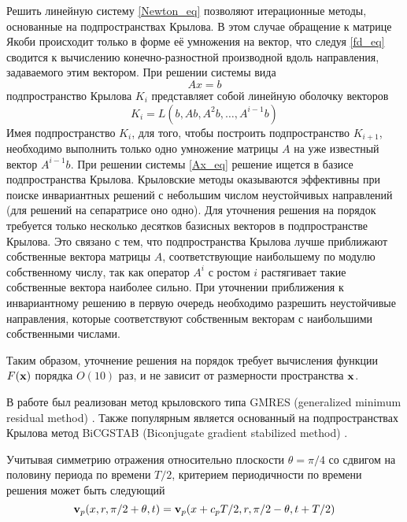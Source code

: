 Решить линейную систему \eqref{Newton_eq} позволяют итерационные методы, основанные на подпространствах Крылова. В этом случае обращение к матрице Якоби происходит только в форме её умножения на вектор, что следуя \eqref{fd_eq} сводится к вычислению конечно-разностной производной вдоль направления, задаваемого этим вектором. При решении системы вида 
\begin{equation}\label{Ax_eq}
Ax = b
\end{equation}
подпространство Крылова $K_i$ представляет собой линейную оболочку векторов
$$
K_i = L(b, Ab, A^2b, \dots, A^{i-1}b)
$$ 
Имея подпространство $K_i$, для того, чтобы построить подпространство $K_{i+1}$, необходимо выполнить только одно умножение матрицы $A$ на уже известный вектор $A^{i-1}b$. При решении системы \eqref{Ax_eq} решение ищется в базисе подпространства Крылова. Крыловские методы оказываются эффективны при поиске инвариантных решений с небольшим числом неустойчивых направлений (для решений на сепаратрисе оно одно). Для уточнения решения на порядок требуется только несколько десятков базисных векторов в подпространстве Крылова. Это связано с тем, что подпространства Крылова лучше приближают собственные вектора матрицы $A$, соответствующие наибольшему по модулю собственному числу, так как оператор $A^i$ с ростом $i$ растягивает такие собственные вектора наиболее сильно. При уточнении приближения к инвариантному решению в первую очередь необходимо разрешить неустойчивые направления, которые соответствуют собственным векторам с наибольшими собственными числами. 


Таким образом, уточнение решения на порядок требует вычисления функции $F(\mathbf{x})$ порядка $O(10)$ раз, и не зависит от размерности пространства $\mathbf{x}$. 

В работе был реализован метод крыловского типа GMRES (generalized minimum residual method) \cite{Saad1986}. Также популярным является основанный на подпространствах Крылова метод BiCGSTAB (Biconjugate gradient stabilized method) \cite{Sleijpen1993}.




Учитывая симметрию отражения относительно плоскости $\theta = \pi/4$ со сдвигом на половину периода по времени $T/2$, критерием периодичности по времени решения может быть следующий
\begin{equation}
\mathbf{v}_p(x,r,\pi/2 + \theta,t) = \mathbf{v}_p(x + c_p T/2,r,\pi/2 - \theta,t+T/2)
\end{equation}




